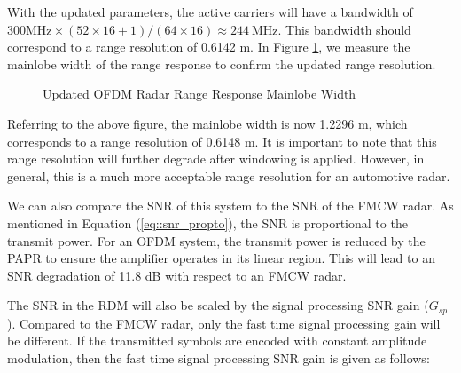 \documentclass[conference]{IEEEtran}
\begin{document}
With the updated parameters, the active carriers will have a bandwidth of $300 \text{MHz} \times (52 \times 16 + 1)/(64 \times 16) \approx 244\ \text{MHz}$. This bandwidth should correspond to a range resolution of 0.6142 m. In Figure \ref{fig::802_11p_ofdm_improved_range_response_mainlobe_width}, we measure the mainlobe width of the range response to confirm the updated range resolution.


\begin{figure}[H]
\centering
{}
\caption{Updated OFDM Radar Range Response Mainlobe Width}
\label{fig::802_11p_ofdm_improved_range_response_mainlobe_width}
\end{figure}

Referring to the above figure, the mainlobe width is now 1.2296 m, which corresponds to a range resolution of 0.6148 m. It is important to note that this range resolution will further degrade after windowing is applied. However, in general, this is a much more acceptable range resolution for an automotive radar.

We can also compare the SNR of this system to the SNR of the FMCW radar. As mentioned in Equation (\ref{eq::snr_propto}), the SNR is proportional to the transmit power. For an OFDM system, the transmit power is reduced by the PAPR to ensure the amplifier operates in its linear region. This will lead to an SNR degradation of 11.8 dB with respect to an FMCW radar.

The SNR in the RDM will also be scaled by the signal processing SNR gain ($G_{sp}$). Compared to the FMCW radar, only the fast time signal processing gain will be different. If the transmitted symbols are encoded with constant amplitude modulation, then the fast time signal processing SNR gain is given as follows:
\end{document}
